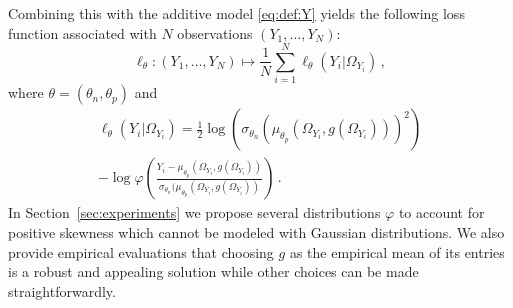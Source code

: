 \documentclass{article}
\begin{document}
Combining this with the additive model  \eqref{eq:def:Y} yields the following loss function associated with $N$ observations $(Y_1,\ldots,Y_N)$:
$$
\ell_{\theta}: (Y_1,\ldots,Y_N) \mapsto \frac{1}{N}\sum_{i=1}^N \ell_{\theta}(Y_i|\Omega_{Y_i})\,,
$$
where $\theta = (\theta_n,\theta_p)$ and
\begin{multline*}
\ell_{\theta}(Y_i|\Omega_{Y_i}) = \frac{1}{2}\log(\sigma_{\theta_n}( \mu_{\theta_p}(\Omega_{Y_i},g(\Omega_{Y_i})))^2) \\
-\log \varphi\left(\frac{Y_i-\mu_{\theta_p}(\Omega_{Y_i},g(\Omega_{Y_i}))}{\sigma_{\theta_n}(\mu_{\theta_p}(\Omega_{Y_i},g(\Omega_{Y_i}))}\right)\,. %
\end{multline*}
In Section~\ref{sec:experiments} we propose several distributions $\varphi$ to account for positive skewness which cannot be modeled with Gaussian distributions. We also provide empirical evaluations that choosing $g$ as the empirical mean of its entries is a robust and appealing solution while other choices can be made straightforwardly.




\end{document}
